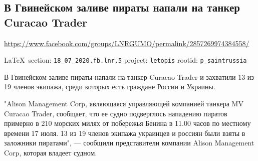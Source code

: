  
 
\subsection{В Гвинейском заливе пираты напали на танкер Curacao Trader}
\label{sec:18_07_2020.fb.lnr.5}
\url{https://www.facebook.com/groups/LNRGUMO/permalink/2857269974384558/}
  
\vspace{0.5cm}
{\small\LaTeX~section: \verb|18_07_2020.fb.lnr.5| project: \verb|letopis| rootid: \verb|p_saintrussia|}
\vspace{0.5cm}
  
В Гвинейском заливе пираты напали на танкер Curacao Trader и захватили 13 из 19
членов экипажа, среди которых есть граждане России и Украины.

"Alison Management Corp, являющаяся управляющей компанией танкера MV Curacao
Trader, сообщает, что ее судно подверглось нападению пиратов примерно в 210
морских милях от побережья Бенина в 11.00 часов по местному времени 17 июля. 13
из 19 членов экипажа украинцев и россиян были взяты в заложники пиратами", —
сообщили представители компании Alison Management Corp, которая владеет судном.
